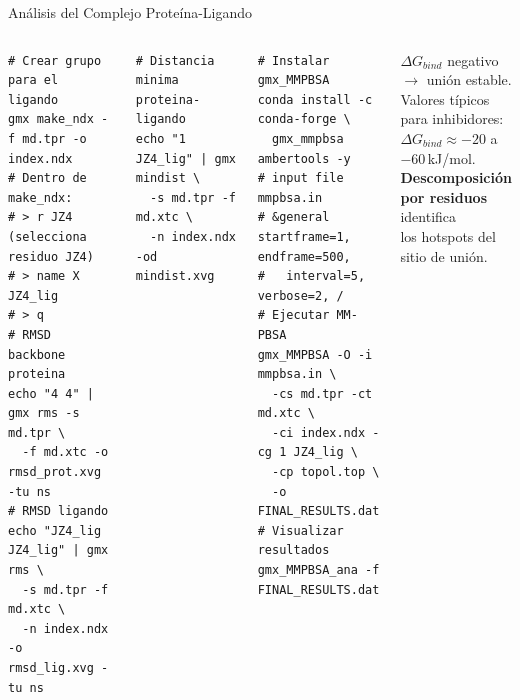 \documentclass[aspectratio=169, 10pt]{beamer}
\begin{document}
\begin{frame}[fragile,shrink=5]{Análisis del Complejo Proteína-Ligando}
\begin{columns}[T]
\begin{tcolorbox}[definitionbox, title={RMSD proteína y ligando}]
\begin{lstlisting}[style=bashstyle]
# Crear grupo para el ligando
gmx make_ndx -f md.tpr -o index.ndx
# Dentro de make_ndx:
# > r JZ4    (selecciona residuo JZ4)
# > name X JZ4_lig
# > q
# RMSD backbone proteina
echo "4 4" | gmx rms -s md.tpr \
  -f md.xtc -o rmsd_prot.xvg -tu ns
# RMSD ligando
echo "JZ4_lig JZ4_lig" | gmx rms \
  -s md.tpr -f md.xtc \
  -n index.ndx -o rmsd_lig.xvg -tu ns
\end{lstlisting}
\end{tcolorbox}
\begin{tcolorbox}[definitionbox, title={Distancia y contactos}]
\begin{lstlisting}[style=bashstyle]
# Distancia minima proteina-ligando
echo "1 JZ4_lig" | gmx mindist \
  -s md.tpr -f md.xtc \
  -n index.ndx -od mindist.xvg
\end{lstlisting}
\end{tcolorbox}
\column{0.47\textwidth}
\begin{tcolorbox}[warningbox, title={Energía libre: MM-PBSA}]
\begin{lstlisting}[style=bashstyle]
# Instalar gmx_MMPBSA
conda install -c conda-forge \
  gmx_mmpbsa ambertools -y
# input file mmpbsa.in
# &general startframe=1, endframe=500,
#   interval=5, verbose=2, /
# Ejecutar MM-PBSA
gmx_MMPBSA -O -i mmpbsa.in \
  -cs md.tpr -ct md.xtc \
  -ci index.ndx -cg 1 JZ4_lig \
  -cp topol.top \
  -o FINAL_RESULTS.dat
# Visualizar resultados
gmx_MMPBSA_ana -f FINAL_RESULTS.dat
\end{lstlisting}
\end{tcolorbox}
\begin{tcolorbox}[comparisonbox]
\small
$\Delta G_{bind}$ negativo $\rightarrow$ unión estable.\\Valores típicos para inhibidores:\\$\Delta G_{bind} \approx -20$ a $-60$\,kJ/mol.\\\textbf{Descomposición por residuos} identifica\\los hotspots del sitio de unión.
\end{tcolorbox}
\end{columns}
\end{frame}
\end{document}
